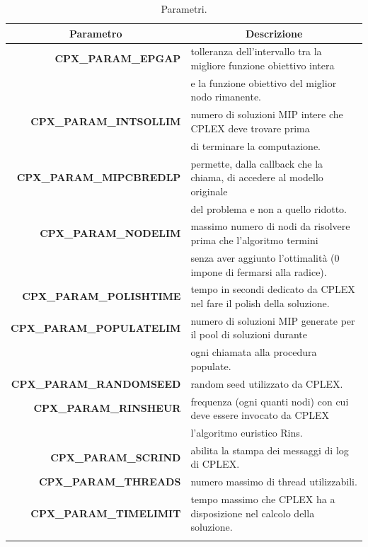 {\footnotesize
\begin{longtable}[h]{rl}
\hline
\multicolumn{1}{c}{\textbf{Parametro}}&\multicolumn{1}{c}{\textbf{Descrizione}}\\
\hline
{\textbf{CPX\_PARAM\_EPGAP}} & {tolleranza dell'intervallo tra la migliore funzione obiettivo intera}\\
& { e la funzione obiettivo del miglior nodo rimanente.}\\
\textbf{CPX\_PARAM\_INTSOLLIM}&{numero di soluzioni MIP intere che CPLEX deve trovare prima}\\
&{di terminare la computazione.}\\
\textbf{CPX\_PARAM\_MIPCBREDLP} & {permette, dalla callback che la chiama, di accedere al modello originale }\\
&{del problema e non a quello ridotto.}\\
{\textbf{CPX\_PARAM\_NODELIM}} & {massimo numero di nodi da risolvere prima che l'algoritmo termini}\\
& {senza aver aggiunto l'ottimalità (0 impone di fermarsi alla radice).}\\
\textbf{CPX\_PARAM\_POLISHTIME} & {tempo in secondi dedicato da CPLEX nel fare il polish della soluzione.}\\
{\textbf{CPX\_PARAM\_POPULATELIM}} & {numero di soluzioni MIP generate per il pool di soluzioni durante}\\
& {ogni chiamata alla procedura populate.}\\
\textbf{CPX\_PARAM\_RANDOMSEED}&{random seed utilizzato da CPLEX.}\\
\textbf{CPX\_PARAM\_RINSHEUR} & {frequenza (ogni quanti nodi) con cui deve essere invocato da CPLEX}\\
&{l'algoritmo euristico Rins.}\\
\textbf{CPX\_PARAM\_SCRIND} & {abilita la stampa dei messaggi di log di CPLEX.}\\
\textbf{CPX\_PARAM\_THREADS} & {numero massimo di thread utilizzabili. }\\
\textbf{CPX\_PARAM\_TIMELIMIT}&{tempo massimo che CPLEX ha a disposizione nel calcolo della soluzione.}\\
\hline
\caption{Parametri.}\label{param_table}
\end{longtable}}

